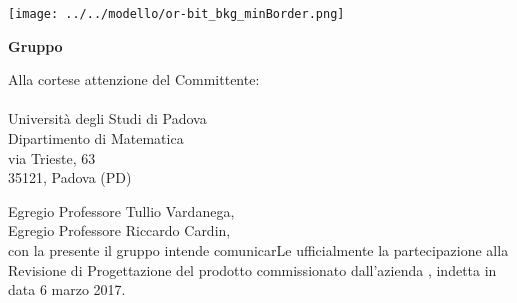   
\begin{titlepage}
	
	\begin{center}
	 	
	\texttt{[image: ../../modello/or-bit\_bkg\_minBorder.png]} 
	\begin{Huge} 
	 	\textbf{Gruppo \GroupName{}}
	\end{Huge}
	\end{center}
	
	\vspace{0,5cm}
	\begin{large}
	\begin{flushright}
		Alla cortese attenzione del Committente: \\
		\Committente \\
		Università degli Studi di Padova \\
		Dipartimento di Matematica \\
		via Trieste, 63 \\
		35121, Padova (PD) 
		
		
	
	\end{flushright}

	\vspace{0,5cm}
	
	Egregio Professore Tullio Vardanega,\\
	Egregio Professore Riccardo Cardin, \\
	
	con la presente il gruppo \GroupName{} intende comunicarLe ufficialmente la partecipazione alla Revisione di Progettazione del prodotto \ProjectName{} commissionato dall'azienda \Proponente{}, indetta in data 6 marzo 2017.\\	
	

\end{large}
\end{titlepage}
